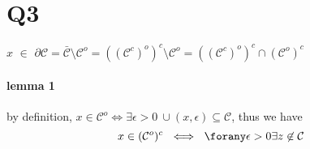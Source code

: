 \documentclass{article}
\begin{document}
\section{Q3}
  $x$ $\in$ $\partial\mathcal{C} = \bar{\mathcal{C}} \setminus \mathcal{C}^o = ((\mathcal{C}^c)^o)^c \setminus \mathcal{C}^o = ((\mathcal{C}^c)^o)^c \cap (\mathcal{C}^o)^c$
  \paragraph{lemma 1}
    by definition, $x \in \mathcal{C}^o \iff \exists \epsilon > 0\ \cup(x, \epsilon) \subseteq \mathcal{C}$, thus we have
    \begin{equation}
      x \in (\mathcal{C}^o)^c\ \iff\ \forany \epsilon > 0 \exists z \not\in \mathcal{C}
    \end{equation}
\end{document}
